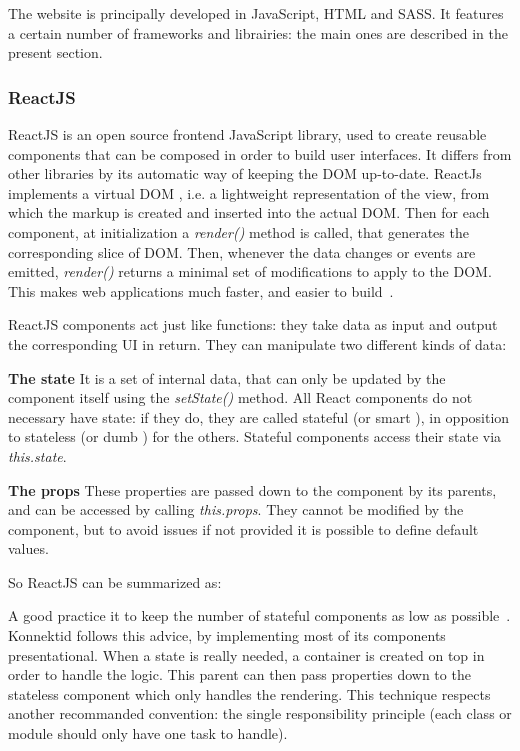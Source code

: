 The website is principally developed in JavaScript, HTML and SASS. It features a certain number of frameworks and librairies: the main ones are described in the present section.

\subsubsection{ReactJS}
\label{sssec:react}

ReactJS is an open source frontend JavaScript library, used to create reusable components that can be composed in order to build user interfaces. It differs from other libraries by its automatic way of keeping the DOM up-to-date. ReactJs implements a \guillemotleft{} virtual DOM \guillemotright{}, i.e. a lightweight representation of the view, from which the markup is created and inserted into the actual DOM. Then for each component, at initialization a \textit{render()} method is called, that generates the corresponding slice of DOM. Then, whenever the data changes or events are emitted, \textit{render()} returns a minimal set of modifications to apply to the DOM.
This makes web applications much faster, and easier to build~\cite{whyReact}.

ReactJS components act just like functions: they take data as input and output the corresponding UI in return. They can manipulate two different kinds of data:

\textbf{The state} It is a set of internal data, that can only be updated by the component itself using the \textit{setState()}  method. All React components do not necessary have state: if they do, they are called \guillemotleft{} stateful \guillemotright{} (or \guillemotleft{} smart \guillemotright{}), in opposition to \guillemotleft{} stateless \guillemotright{} (or \guillemotleft{} dumb \guillemotright{}) for the others. Stateful components access their state via \textit{this.state}.

\textbf{The props} These properties are passed down to the component by its parents, and can be accessed by calling \textit{this.props}. They cannot be modified by the component, but to avoid issues if not provided it is possible to define default values.

So ReactJS can be summarized as: 

A good practice it to keep the number of stateful components as low as possible~\cite{state}. Konnektid follows this advice, 
by implementing most of its components presentational. When a state is really needed, a \guillemotleft{} container \guillemotright{} is created on top in order to handle the logic. This parent can then pass properties down to the stateless component which only handles the rendering. This technique respects another recommanded convention: the single responsibility principle (each class or module should only have one task to handle). 

